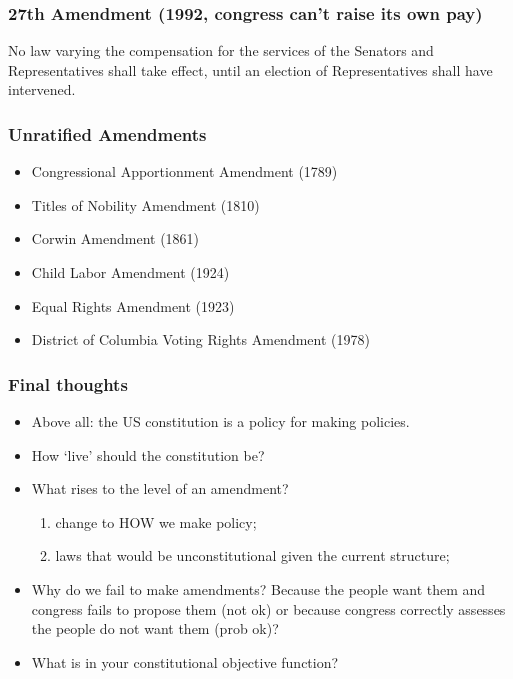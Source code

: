 \documentclass[aspectratio=169]{beamer}
\theoremstyle{principle}
\begin{document}
\begin{frame}
\frametitle{27th Amendment (1992, congress can't raise its own pay)}
No law varying the compensation for the services of the Senators and Representatives shall take effect, until an election of Representatives shall have intervened.
\end{frame}

\begin{frame}
\frametitle{Unratified Amendments}
\begin{itemize}
\item Congressional Apportionment Amendment (1789)
\bigskip
\item Titles of Nobility Amendment (1810)
\bigskip
\item Corwin Amendment (1861)
\bigskip
\item Child Labor Amendment (1924)
\bigskip
\item Equal Rights Amendment (1923)
\bigskip
\item District of Columbia Voting Rights Amendment (1978)
\end{itemize}
\end{frame}


\begin{frame}
\frametitle{Final thoughts}

\begin{itemize}
\item Above all: the US constitution is a policy for making policies.
\bigskip
\item How `live' should the constitution be?
\bigskip
\item What rises to the level of an amendment?
\bigskip
\begin{enumerate}
\item change to HOW we make policy;
\bigskip
\item laws that would be unconstitutional given the current structure;
\end{enumerate}
\bigskip
\item Why do we fail to make amendments?  Because the people want them and congress fails to propose them (not ok) or because congress correctly assesses the people do not want them (prob ok)?
\bigskip
\item What is in your constitutional objective function?
\end{itemize}

\end{frame}
\end{document}

